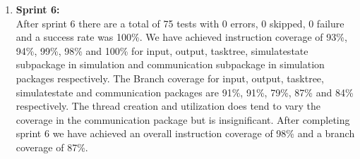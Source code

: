 \begin{enumerate}
\item \textbf{Sprint 6:} \\

After sprint 6 there are a total of 75 tests with 0 errors, 0 skipped, 0 failure and a success rate was 100\%. We have achieved instruction coverage of 93\%, 94\%, 99\%, 98\% and 100\% for input, output, tasktree, simulatestate subpackage in simulation and communication subpackage in simulation packages respectively. The Branch coverage for input, output, tasktree, simulatestate and communication packages are 91\%, 91\%, 79\%, 87\% and 84\% respectively. The thread creation and utilization does tend to vary the coverage in the communication package but is insignificant. After completing sprint 6 we have achieved an overall instruction coverage of 98\% and a branch coverage of 87\%.


\end{enumerate}